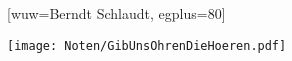 [wuw={Berndt Schlaudt}, egplus={80}]

\beginverse
\endverse
\centering\texttt{[image: Noten/GibUnsOhrenDieHoeren.pdf]}	

\endsong
